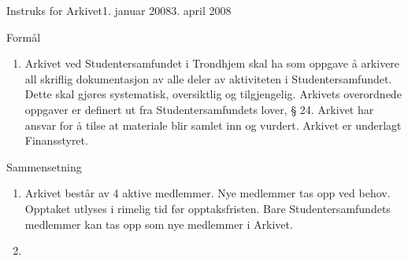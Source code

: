 
\begin{instruks}{Instruks for Arkivet}{1. januar 2008}{3. april 2008}
    
    \begin{instruksledd}{Formål}
        \begin{enumerate}
            \item Arkivet ved Studentersamfundet i Trondhjem skal ha som oppgave å
                arkivere all skriflig dokumentasjon av alle deler av aktiviteten i
                Studentersamfundet. Dette skal gjøres systematisk, oversiktlig og
                tilgjengelig. Arkivets overordnede oppgaver er definert ut fra
                Studentersamfundets lover, § 24. Arkivet har ansvar for å tilse at
                materiale blir samlet inn og vurdert. Arkivet er underlagt Finansstyret.
        \end{enumerate}
    \end{instruksledd}

    \begin{instruksledd}{Sammensetning}
        \begin{enumerate}
            \item Arkivet består av 4 aktive medlemmer. Nye medlemmer tas opp ved behov.
                Opptaket utlyses i rimelig tid før opptaksfristen. Bare
                Studentersamfundets medlemmer kan tas opp som nye medlemmer i Arkivet.
            \item
        \end{enumerate}
    \end{instruksledd}

\end{instruks}



